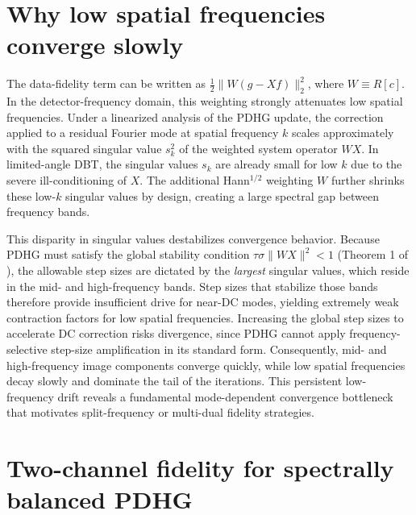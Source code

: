 \documentclass[journal, a4paper]{IEEEtran}
\begin{document}
\section{Why low spatial frequencies converge slowly}

The data-fidelity term can be written as $\tfrac{1}{2}\|W(g - Xf)\|_2^2$, where $W \equiv R[c]$. In the detector-frequency domain, this weighting strongly attenuates low spatial frequencies. Under a linearized analysis of the PDHG update, the correction applied to a residual Fourier mode at spatial frequency $k$ scales approximately with the squared singular value $s_k^2$ of the weighted system operator $WX$. In limited-angle DBT, the singular values $s_k$ are already small for low $k$ due to the severe ill-conditioning of $X$. The additional Hann$^{1/2}$ weighting $W$ further shrinks these low-$k$ singular values by design, creating a large spectral gap between frequency bands.

This disparity in singular values destabilizes convergence behavior. Because PDHG must satisfy the global stability condition $\tau \sigma \|WX\|^2 < 1$ (Theorem 1 of \cite{chambolle2011first}), the allowable step sizes are dictated by the \emph{largest} singular values, which reside in the mid- and high-frequency bands. Step sizes that stabilize those bands therefore provide insufficient drive for near-DC modes, yielding extremely weak contraction factors for low spatial frequencies. Increasing the global step sizes to accelerate DC correction risks divergence, since PDHG cannot apply frequency-selective step-size amplification in its standard form. Consequently, mid- and high-frequency image components converge quickly, while low spatial frequencies decay slowly and dominate the tail of the iterations. This persistent low-frequency drift reveals a fundamental mode-dependent convergence bottleneck that motivates split-frequency or multi-dual fidelity strategies.

\section{Two-channel fidelity for spectrally balanced PDHG}
\end{document}
